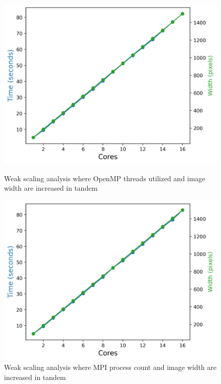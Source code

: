 \begin{figure}[h]
  \centering
  \begin{minipage}{0.45\linewidth}
      \includegraphics[width=\linewidth]{figs/omp_weak2.out}
      \caption{Weak scaling analysis where OpenMP threads utilized and image width are increased in tandem}
        \label{fig:omp_weak2}
    \end{minipage}
  \hspace{.05\linewidth}
 \begin{minipage}{0.45\linewidth}
  \includegraphics[width=\linewidth]{figs/mpi_weak2.out}
 \caption{Weak scaling analysis where MPI process count and image width are increased in tandem
}
\end{minipage}
\end{figure}
